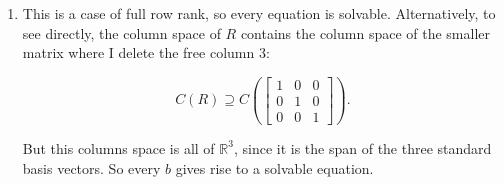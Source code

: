 \documentclass[11pt]{article}
\newcommand{\rr}{\mathbb{R}}
\begin{document}
\begin{enumerate}
\begin{enumerate}
\item This is a case of full row rank, so every equation is solvable.  Alternatively, to see directly, the column space of $R$ contains the column space of the smaller matrix where I delete the free column $3$:

\[ C(R) \supseteq C\left(\begin{bmatrix} 1 & 0 & 0 \\ 0 & 1  & 0 \\ 0 & 0 & 1 \end{bmatrix} \right). \]

But this columns space is all of $\rr^3$, since it is the span of the three standard basis vectors.  So every $b$ gives rise to a solvable equation.





\end{enumerate}

\end{enumerate}
\end{document}
